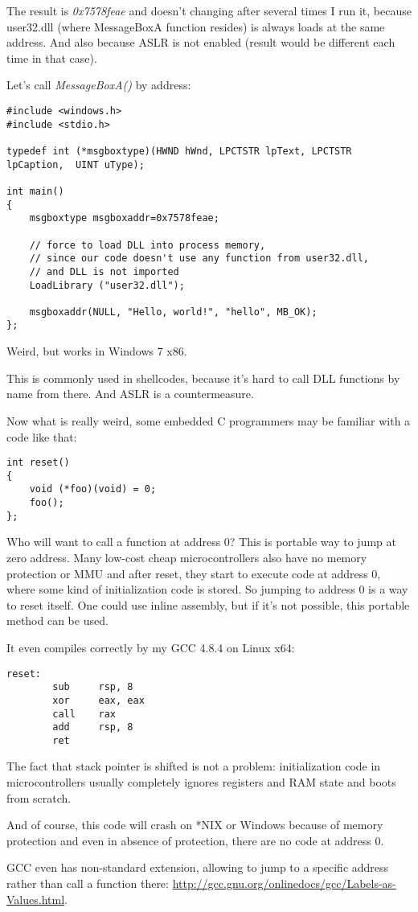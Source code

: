 The result is \emph{0x7578feae} and doesn't changing after several times I run it,
because user32.dll (where MessageBoxA function resides) is always loads at the same address.
And also because \ac{ASLR} is not enabled (result would be different each time in that case).

Let's call \emph{MessageBoxA()} by address:

\begin{lstlisting}[style=customc]
#include <windows.h>
#include <stdio.h>

typedef int (*msgboxtype)(HWND hWnd, LPCTSTR lpText, LPCTSTR lpCaption,  UINT uType);

int main()
{
	msgboxtype msgboxaddr=0x7578feae;

	// force to load DLL into process memory, 
	// since our code doesn't use any function from user32.dll, 
	// and DLL is not imported
	LoadLibrary ("user32.dll");

	msgboxaddr(NULL, "Hello, world!", "hello", MB_OK);
};
\end{lstlisting}

Weird, but works in Windows 7 x86.

This is commonly used in shellcodes, because it's hard to call DLL functions by name from there.
And \ac{ASLR} is a countermeasure.

Now what is really weird, some embedded C programmers may be familiar with a code like that:

\begin{lstlisting}[style=customc]
int reset()
{
	void (*foo)(void) = 0;
	foo();
};
\end{lstlisting}

Who will want to call a function at address 0?
This is portable way to jump at zero address.
Many low-cost cheap microcontrollers also have no memory protection or \ac{MMU} and after reset, they start to execute code at address 0, where some kind of initialization code is stored.
So jumping to address 0 is a way to reset itself.
One could use inline assembly, but if it's not possible, this portable method can be used.

It even compiles correctly by my GCC 4.8.4 on Linux x64:

\begin{lstlisting}[style=customasmx86]
reset:
        sub     rsp, 8
        xor     eax, eax
        call    rax
        add     rsp, 8
        ret
\end{lstlisting}

The fact that stack pointer is shifted is not a problem: initialization code in microcontrollers usually completely ignores registers and \ac{RAM} state and boots from scratch.

And of course, this code will crash on *NIX or Windows because of memory protection and even in absence of protection, there are no code at address 0.

GCC even has non-standard extension, allowing to jump to a specific address rather than call a function there:
\url{http://gcc.gnu.org/onlinedocs/gcc/Labels-as-Values.html}.

